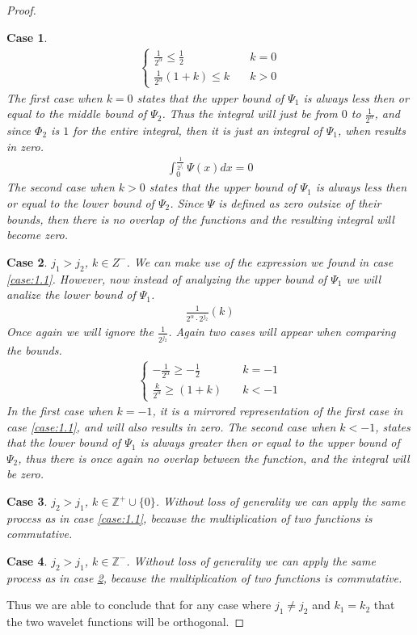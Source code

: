 \documentclass[12pt]{amsart}
\newcommand{\Z}{\mathbb{Z}}
\newtheorem{case}{Case}
\begin{document}
\begin{proof}
\begin{case}
\begin{align}
      \begin{cases}
        \frac{1}{2^\alpha} \leq \frac{1}{2} &\quad k =0\\
        \frac{1}{2^\alpha}(1+k) \leq k &\quad k >0
      \end{cases}
    \end{align} 
    The first case when $k=0$ states that the upper bound of $\Psi_1$ is
    always less then or equal to the middle bound of $\Psi_2$. Thus the
    integral will just be from $0$ to $\frac{1}{2^\alpha}$, and since $\Phi_2$
    is $1$ for the entire integral, then it is just an integral of $\Psi_1$,
    when results in zero.
    \begin{align}
     \int_{0}^{\frac{1}{2^{j_1}}}\Psi(x)dx = 0
    \end{align}
    The second case when $k>0$ states that the upper bound of $\Psi_1$ is
    always less then or equal to the lower bound of $\Psi_2$. Since $\Psi$ is
    defined as zero outsize of their bounds, then there is no overlap of the
    functions and the resulting integral will become zero.
  \end{case}
  \begin{case}\label{case:1.2}
    $j_1>j_2$, $k\in Z^-$. We can make use of the expression we found in
    case \ref{case:1.1}. However, now instead of analyzing the upper bound of
    $\Psi_1$ we will analize the lower bound of $\Psi_1$.
    \begin{align}
      \frac{1}{2^\alpha\cdot 2^{j_2}}(k)
    \end{align}
    Once again we will ignore the $\frac{1}{2^{j_2}}$. Again two cases will
    appear when comparing the bounds.
    \begin{align}
       \begin{cases}
         -\frac{1}{2^\alpha} \geq -\frac{1}{2} &\quad k=-1\\
         \frac{k}{2^\alpha} \geq (1+k) &\quad k<-1
       \end{cases}
    \end{align}
    In the first case when $k=-1$, it is a mirrored representation of the
    first case in case \ref{case:1.1}, and will also results in zero. The
    second case when $k<-1$, states that the lower bound of $\Psi_1$ is always
    greater then or equal to the upper bound of $\Psi_2$, thus there is once
    again no overlap between the function, and the integral will be zero.
  \end{case}
  \begin{case}\label{case:1.3}
    $j_2>j_1$, $k\in \Z^+ \cup \{0\}$. Without loss of generality we can apply
    the same process as in case \ref{case:1.1}, because the multiplication of
    two functions is commutative.
  \end{case}
  \begin{case}\label{case:1.4}
    $j_2>j_1$, $k\in \Z^-$. Without loss of generality we can apply
    the same process as in case \ref{case:1.2}, because the multiplication of
    two functions is commutative.
  \end{case}

  Thus we are able to conclude that for any case where $j_1 \neq j_2$ and
  $k_1=k_2$ that the two wavelet functions will be orthogonal.
\end{proof}
\end{document}

